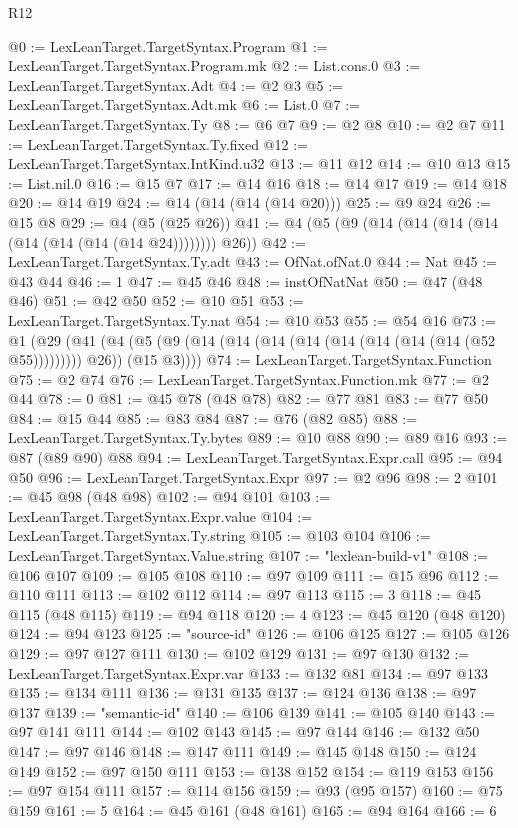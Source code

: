 \begin{lexlean}{R12}
\begin{coremodule}
@0 := LexLeanTarget.TargetSyntax.Program
@1 := LexLeanTarget.TargetSyntax.Program.mk
@2 := List.cons.{0}
@3 := LexLeanTarget.TargetSyntax.Adt
@4 := @2 @3
@5 := LexLeanTarget.TargetSyntax.Adt.mk
@6 := List.{0}
@7 := LexLeanTarget.TargetSyntax.Ty
@8 := @6 @7
@9 := @2 @8
@10 := @2 @7
@11 := LexLeanTarget.TargetSyntax.Ty.fixed
@12 := LexLeanTarget.TargetSyntax.IntKind.u32
@13 := @11 @12
@14 := @10 @13
@15 := List.nil.{0}
@16 := @15 @7
@17 := @14 @16
@18 := @14 @17
@19 := @14 @18
@20 := @14 @19
@24 := @14 (@14 (@14 (@14 @20)))
@25 := @9 @24
@26 := @15 @8
@29 := @4 (@5 (@25 @26))
@41 := @4 (@5 (@9 (@14 (@14 (@14 (@14 (@14 (@14 (@14 (@14 @24)))))))) @26))
@42 := LexLeanTarget.TargetSyntax.Ty.adt
@43 := OfNat.ofNat.{0}
@44 := Nat
@45 := @43 @44
@46 := 1
@47 := @45 @46
@48 := instOfNatNat
@50 := @47 (@48 @46)
@51 := @42 @50
@52 := @10 @51
@53 := LexLeanTarget.TargetSyntax.Ty.nat
@54 := @10 @53
@55 := @54 @16
@73 := @1
    (@29
      (@41 (@4 (@5 (@9 (@14 (@14 (@14 (@14 (@14 (@14 (@14 (@14 (@52 @55))))))))) @26)) (@15 @3))))
@74 := LexLeanTarget.TargetSyntax.Function
@75 := @2 @74
@76 := LexLeanTarget.TargetSyntax.Function.mk
@77 := @2 @44
@78 := 0
@81 := @45 @78 (@48 @78)
@82 := @77 @81
@83 := @77 @50
@84 := @15 @44
@85 := @83 @84
@87 := @76 (@82 @85)
@88 := LexLeanTarget.TargetSyntax.Ty.bytes
@89 := @10 @88
@90 := @89 @16
@93 := @87 (@89 @90) @88
@94 := LexLeanTarget.TargetSyntax.Expr.call
@95 := @94 @50
@96 := LexLeanTarget.TargetSyntax.Expr
@97 := @2 @96
@98 := 2
@101 := @45 @98 (@48 @98)
@102 := @94 @101
@103 := LexLeanTarget.TargetSyntax.Expr.value
@104 := LexLeanTarget.TargetSyntax.Ty.string
@105 := @103 @104
@106 := LexLeanTarget.TargetSyntax.Value.string
@107 := "lexlean-build-v1"
@108 := @106 @107
@109 := @105 @108
@110 := @97 @109
@111 := @15 @96
@112 := @110 @111
@113 := @102 @112
@114 := @97 @113
@115 := 3
@118 := @45 @115 (@48 @115)
@119 := @94 @118
@120 := 4
@123 := @45 @120 (@48 @120)
@124 := @94 @123
@125 := "source-id"
@126 := @106 @125
@127 := @105 @126
@129 := @97 @127 @111
@130 := @102 @129
@131 := @97 @130
@132 := LexLeanTarget.TargetSyntax.Expr.var
@133 := @132 @81
@134 := @97 @133
@135 := @134 @111
@136 := @131 @135
@137 := @124 @136
@138 := @97 @137
@139 := "semantic-id"
@140 := @106 @139
@141 := @105 @140
@143 := @97 @141 @111
@144 := @102 @143
@145 := @97 @144
@146 := @132 @50
@147 := @97 @146
@148 := @147 @111
@149 := @145 @148
@150 := @124 @149
@152 := @97 @150 @111
@153 := @138 @152
@154 := @119 @153
@156 := @97 @154 @111
@157 := @114 @156
@159 := @93 (@95 @157)
@160 := @75 @159
@161 := 5
@164 := @45 @161 (@48 @161)
@165 := @94 @164
@166 := 6

\end{coremodule}
\end{lexlean}
